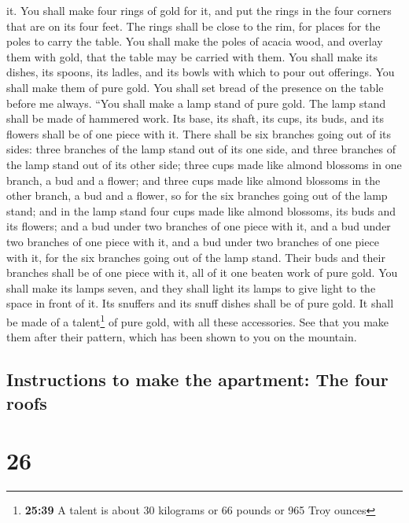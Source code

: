 it.  You shall make four rings of gold for it, and put
the rings in the four corners that are on its four feet. 
The rings shall be close to the rim, for places for the poles to carry
the table.  You shall make the poles of acacia wood, and
overlay them with gold, that the table may be carried with them.
 You shall make its dishes, its spoons, its ladles, and
its bowls with which to pour out offerings. You shall make them of pure
gold.  You shall set bread of the presence on the table
before me always.  ``You shall make a lamp stand of pure
gold. The lamp stand shall be made of hammered work. Its base, its
shaft, its cups, its buds, and its flowers shall be of one piece with
it.  There shall be six branches going out of its sides:
three branches of the lamp stand out of its one side, and three branches
of the lamp stand out of its other side;  three cups made
like almond blossoms in one branch, a bud and a flower; and three cups
made like almond blossoms in the other branch, a bud and a flower, so
for the six branches going out of the lamp stand;  and in
the lamp stand four cups made like almond blossoms, its buds and its
flowers;  and a bud under two branches of one piece with
it, and a bud under two branches of one piece with it, and a bud under
two branches of one piece with it, for the six branches going out of the
lamp stand.  Their buds and their branches shall be of
one piece with it, all of it one beaten work of pure gold.
 You shall make its lamps seven, and they shall light its
lamps to give light to the space in front of it.  Its
snuffers and its snuff dishes shall be of pure gold.  It
shall be made of a talent\footnote{\textbf{25:39} A talent is about 30
  kilograms or 66 pounds or 965 Troy ounces} of pure gold, with all
these accessories.  See that you make them after their
pattern, which has been shown to you on the mountain.

\hypertarget{instructions-to-make-the-apartment-the-four-roofs}{%
\subsection{Instructions to make the apartment: The four
roofs}\label{instructions-to-make-the-apartment-the-four-roofs}}

\hypertarget{section-25}{%
\section{26}\label{section-25}}

